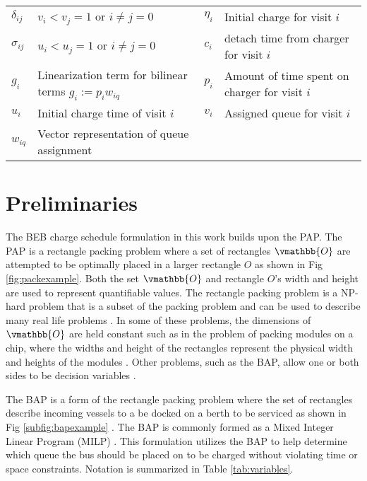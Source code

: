 \documentclass[letterpaper, 10pt, conference]{IEEEtran}
\begin{document}
\begin{table*}[!t]
\begin{tabular}{l l l l}
			$\delta_{ij}$ & $v_i < v_j = 1$ \textrm{ or } $i \neq j = 0$                    &
			$\eta_i$      & Initial charge for visit $i$                                    \\
			$\sigma_{ij}$ & $u_i < u_j = 1$ \textrm{ or } $i \neq j = 0$                    &
			$c_i$         & detach time from charger for visit $i$                          \\
			$g_i$         & Linearization term for bilinear terms $g_i := p_i w_{iq}$       &
			$p_i$         & Amount of time spent on charger for visit $i$                   \\
			$u_i$         & Initial charge time of visit $i$                                &
			$v_i$         & Assigned queue for visit $i$                                    \\
			$w_{iq}$      & Vector representation of queue assignment                       \\
			\bottomrule
	\end{tabular}
\end{table*}

\section{Preliminaries}
\label{sec:preliminaries}
The BEB charge schedule formulation in this work builds upon the PAP. The PAP is a rectangle packing problem where a set of rectangles \(\vmathbb{O}\) are attempted to be optimally placed in a larger rectangle \(O\) as shown in Fig \ref{fig:packexample}. Both the set \(\vmathbb{O}\) and rectangle \(O\)'s width and height are used to represent quantifiable values. The rectangle packing problem is a NP-hard problem that is a subset of the packing problem and can be used to describe many real life problems \cite{Bruin2013,Murata1995}. In some of these problems, the dimensions of \(\vmathbb{O}\) are held constant such as in the problem of packing modules on a chip, where the widths and height of the rectangles represent the physical width and heights of the modules \cite{Murata1995}. Other problems, such as the BAP, allow one or both sides to be decision variables \cite{Buhrkal2010}.

The BAP is a form of the rectangle packing problem where the set of rectangles describe incoming vessels to a be docked on a berth to be serviced as shown in Fig \ref{subfig:bapexample} \cite{Dai2008}. The BAP is commonly formed as a Mixed Integer Linear Program (MILP) \cite{Frojan2015,Buhrkal2010}. This formulation utilizes the BAP to help determine which queue the bus should be placed on to be charged without violating time or space constraints. Notation is summarized in Table \ref{tab:variables}.
\end{document}
